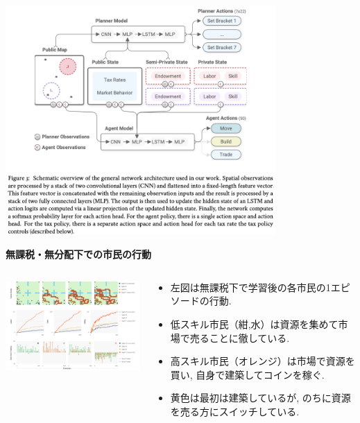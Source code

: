 \documentclass[unicode,aspectratio=169,11pt]{beamer}
\begin{document}
\begin{frame}{}{}
    \begin{center}
        \includegraphics[width=10.3cm]{figure3.png}
    \end{center}
\end{frame}

\begin{frame}{}{}
    {\bf 無課税・無分配下での市民の行動}
\begin{columns}[t]
    \begin{column}[]{0.6\textwidth}
        \begin{center}
            \includegraphics[width=9cm]{figure4.png}
        \end{center}
    \end{column}
    \begin{column}[]{0.4\textwidth}
        \begin{itemize}
            \item 左図は無課税下で学習後の各市民の1エピソードの行動.
            \item 低スキル市民（紺,水）は資源を集めて市場で売ることに徹している.
            \item 高スキル市民（オレンジ）は市場で資源を買い, 自身で建築してコインを稼ぐ.
            \item 黄色は最初は建築しているが, のちに資源を売る方にスイッチしている.
        \end{itemize}
    \end{column}
    
\end{columns}
\end{frame}
\end{document}
